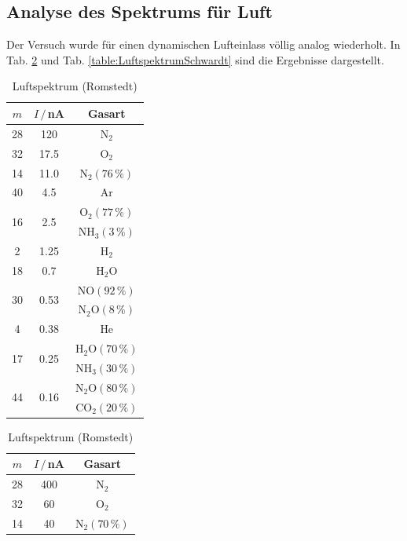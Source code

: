 \documentclass[german, parskip=full]{scrartcl}
\newcommand{\tecxt}{}
\begin{document}
\subsection{Analyse des Spektrums für Luft}
Der Versuch wurde für einen dynamischen Lufteinlass völlig analog wiederholt. In Tab. \ref{table:LuftspektrumRomstedt} und Tab. \ref{table:LuftspektrumSchwardt} sind die Ergebnisse dargestellt.
\begin{table}[!htp]
\centering
\begin{minipage}{0.5\textwidth}
\centering
\begin{tabular}{c|c|c}
$m$&$I\,/\,$nA&Gasart\\ \hline
28&120&$\tecxt\text{N}_2$\\ \hline
32&17.5&$\tecxt\text{O}_2$\\ \hline
14&11.0&$\tecxt\text{N}_2(76\,\%)$\\ \hline
40&4.5&$\tecxt\text{Ar}$\\ \hline
\multirow{2}{*}{16}&\multirow{2}{*}{2.5}&$\tecxt\text{O}_2(77\,\%)$\\ 
&&$\tecxt\text{NH}_3(3\,\%)$\\ \hline
2&1.25&$\tecxt\text{H}_2$\\ \hline
18&0.7&$\tecxt\text{H}_2\tecxt\text{O}$\\ \hline
\multirow{2}{*}{30}&\multirow{2}{*}{0.53}&$\tecxt\text{NO}(92\,\%)$\\
&&$\tecxt\text{N}_2\tecxt\text{O}(8\,\%)$\\ \hline
4&0.38&He\\ \hline
\multirow{2}{*}{17}&\multirow{2}{*}{0.25}&$\tecxt\text{H}_2\tecxt\text{O}(70\,\%)$\\ 
&&$\tecxt\text{NH}_3(30\,\%)$\\ \hline
\multirow{2}{*}{44}&\multirow{2}{*}{0.16}&$\tecxt\text{N}_2\tecxt\text{O}(80\,\%)$\\ 
&&$\tecxt\text{CO}_2(20\,\%)$\\
\end{tabular}
\caption{Luftspektrum (Romstedt)}
\label{table:LuftspektrumRomstedt}
\end{minipage}%
\begin{minipage}{0.5\textwidth}
\centering
\begin{tabular}{c|c|c}
$m$&$I\,/\,$nA&Gasart\\ \hline
28&400&$\tecxt\text{N}_2$\\ \hline
32&60&$\tecxt\text{O}_2$\\ \hline
14&40&$\tecxt\text{N}_2(70\,\%)$\\ \hline

\end{tabular}
\end{minipage}
\end{table}
\end{document}
